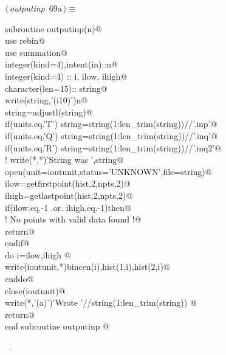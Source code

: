\documentclass[10pt,a4paper,notitlepage]{article}
\begin{document}
\begin{flushleft} \small
\begin{minipage}{\linewidth}\label{scrap74}\raggedright\small
{} $\langle\,${\it outputinp}\nobreak\ {\footnotesize {69a}}$\,\rangle\equiv$
\vspace{-1ex}
\begin{list}{}{} \item
\mbox{}\verb@      subroutine outputinp(n)@\\
\mbox{}\verb@      use rebin@\\
\mbox{}\verb@      use summation@\\
\mbox{}\verb@      integer(kind=4),intent(in)::n@\\
\mbox{}\verb@      integer(kind=4) :: i, ilow, ihigh@\\
\mbox{}\verb@      character(len=15):: string@\\
\mbox{}\verb@      write(string,'(i10)')n@\\
\mbox{}\verb@      string=adjustl(string)@\\
\mbox{}\verb@      if(units.eq.'T') string=string(1:len_trim(string))//'.inp'@\\
\mbox{}\verb@      if(units.eq.'Q') string=string(1:len_trim(string))//'.inq'@\\
\mbox{}\verb@      if(units.eq.'R') string=string(1:len_trim(string))//'.inq2'@\\
\mbox{}\verb@!      write(*,*)'String was ',string@\\
\mbox{}\verb@      open(unit=ioutunit,status='UNKNOWN',file=string)@\\
\mbox{}\verb@      ilow=getfirstpoint(hist,2,npts,2)@\\
\mbox{}\verb@      ihigh=getlastpoint(hist,2,npts,2)@\\
\mbox{}\verb@      if(ilow.eq.-1 .or. ihigh.eq.-1)then@\\
\mbox{}\verb@       ! No points with valid data found !@\\
\mbox{}\verb@       return@\\
\mbox{}\verb@      endif@\\
\mbox{}\verb@      do i=ilow,ihigh     @\\
\mbox{}\verb@        write(ioutunit,*)bincen(i),hist(1,i),hist(2,i)@\\
\mbox{}\verb@      enddo@\\
\mbox{}\verb@      close(ioutunit)@\\
\mbox{}\verb@      write(*,'(a)')'Wrote '//string(1:len_trim(string)) @\\
\mbox{}\verb@      return@\\
\mbox{}\verb@      end subroutine outputinp                                               @{\NWsep}
\end{list}
\vspace{-1.5ex}
\footnotesize
\begin{list}{}{\setlength{\itemsep}{-\parsep}\setlength{\itemindent}{-\leftmargin}}
\item \NWtxtMacroRefIn\ .


\end{list}
\end{minipage}
\end{flushleft}
\end{document}
